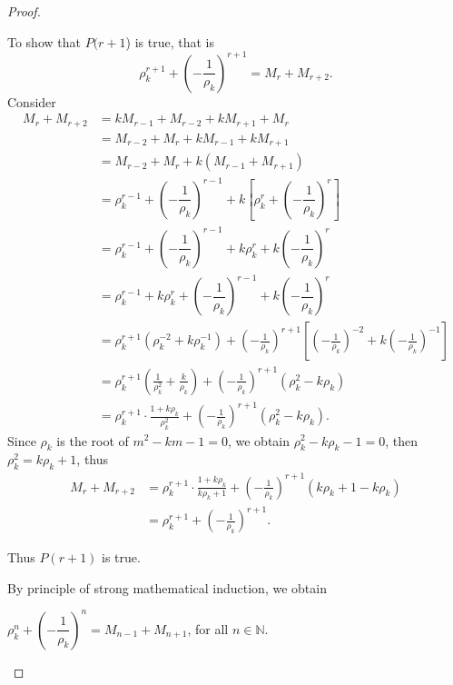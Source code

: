 \documentclass{rmutt-seminar}
\begin{document}
\begin{proof}
\begin{enumerate}[label=(\roman*),leftmargin = 1.5cm]
To show that $P(r+1$) is true, that is
\begin{equation*}
	 \rho_k^{r+1} + \left(-\dfrac{1}{\rho_k}\right)^{r+1} = M_{r} + M_{r+2}.
\end{equation*}  
 Consider
 \begin{align*}
	M_{r} + M_{r+2} &= kM_{r-1} + M_{r-2} + kM_{r+1} + M_r \\
	&= M_{r-2} + M_r + kM_{r-1} + kM_{r+1} \\
	&= M_{r-2} + M_r + k(M_{r-1} + M_{r+1}) \\
	&= \rho_k^{r-1} + \left(-\dfrac{1}{\rho_k}\right)^{r-1} +k\left[\rho_k^{r} + \left(-\dfrac{1}{\rho_k}\right)^{r} \right]\\
	&= \rho_k^{r-1} + \left(-\dfrac{1}{\rho_k}\right)^{r-1} +k\rho_k^{r} + k\left(-\dfrac{1}{\rho_k}\right)^{r} \\
	&= \rho_k^{r-1} + k\rho_k^{r} + \left(-\dfrac{1}{\rho_k}\right)^{r-1} + k\left(-\dfrac{1}{\rho_k}\right)^{r} \\
	&= \rho_k^{r+1}(\rho_k^{-2} + k\rho_k^{-1}) + \left(-\frac{1}{\rho_k}\right)^{r+1} \left[ \left(-\frac{1}{\rho_k}\right)^{-2} + k\left(-\frac{1}{\rho_k}\right)^{-1}\right] \\
	&= \rho_k^{r+1} \left(\frac{1}{\rho_k^2} + \frac{k}{\rho_k}\right) + \left(-\frac{1}{\rho_k}\right)^{r+1}(\rho_k^2-k\rho_k) \\
	&= \rho_k^{r+1} \cdot \frac{1+k\rho_k}{\rho_k^2}+\left(-\frac{1}{\rho_k}\right)^{r+1}(\rho_k^2-k\rho_k).
\end{align*}
Since $\rho_k$ is the root of $m^2 -km -1 =0$, we obtain $\rho_k^2-k\rho_k-1=0$, then $\rho_k^2 = k\rho_k + 1$, thus
 \begin{align*}
 M_{r} + M_{r+2} &= \rho_k^{r+1} \cdot \frac{1+k\rho_k}{k\rho_k+1}+\left(-\frac{1}{\rho_k}\right)^{r+1}(k\rho_k+1-k\rho_k)\\
 &= \rho_k^{r+1} +\left(-\frac{1}{\rho_k}\right)^{r+1}.
 \end{align*}	
 
 Thus $P(r+1)$ is true.
 
By principle of strong mathematical induction, we obtain 
\begin{center}
$\rho_k^n + \left(-\dfrac{1}{\rho_k}\right)^n = M_{n-1} + M_{n+1} $, for all $n \in \mathbb{N}$.
\end{center}
\end{enumerate}
\end{proof}
\end{document}
